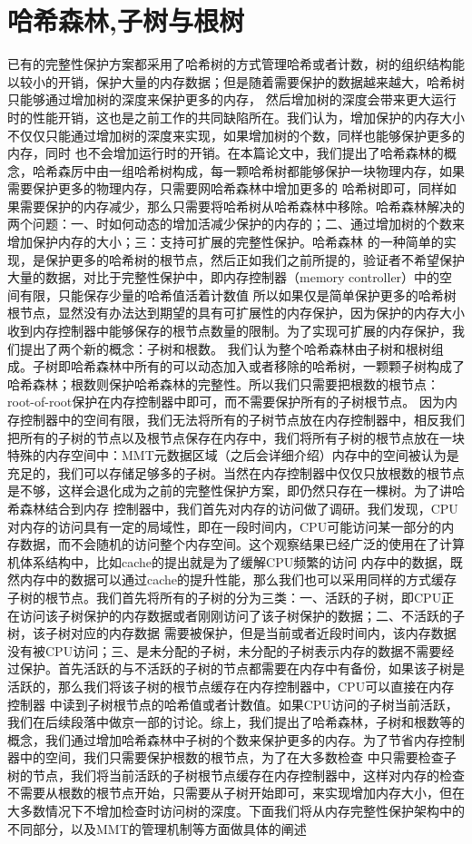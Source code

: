 \section{哈希森林,子树与根树}
已有的完整性保护方案都采用了哈希树的方式管理哈希或者计数，树的组织结构能以较小的开销，保护大量的内存数据；但是随着需要保护的数据越来越大，哈希树只能够通过增加树的深度来保护更多的内存，
然后增加树的深度会带来更大运行时的性能开销，这也是之前工作的共同缺陷所在。我们认为，增加保护的内存大小不仅仅只能通过增加树的深度来实现，如果增加树的个数，同样也能够保护更多的内存，同时
也不会增加运行时的开销。在本篇论文中，我们提出了哈希森林的概念，哈希森厉中由一组哈希树构成，每一颗哈希树都能够保护一块物理内存，如果需要保护更多的物理内存，只需要网哈希森林中增加更多的
哈希树即可，同样如果需要保护的内存减少，那么只需要将哈希树从哈希森林中移除。哈希森林解决的两个问题：一、时如何动态的增加活减少保护的内存的；二、通过增加树的个数来增加保护内存的大小；三：支持可扩展的完整性保护。哈希森林
的一种简单的实现，是保护更多的哈希树的根节点，然后正如我们之前所提的，验证者不希望保护大量的数据，对比于完整性保护中，即内存控制器（memory controller）中的空间有限，只能保存少量的哈希值活着计数值
所以如果仅是简单保护更多的哈希树根节点，显然没有办法达到期望的具有可扩展性的内存保护，因为保护的内存大小收到内存控制器中能够保存的根节点数量的限制。为了实现可扩展的内存保护，我们提出了两个新的概念：子树和根数。
我们认为整个哈希森林由子树和根树组成。子树即哈希森林中所有的可以动态加入或者移除的哈希树，一颗颗子树构成了哈希森林；根数则保护哈希森林的完整性。所以我们只需要把根数的根节点：root-of-root保护在内存控制器中即可，而不需要保护所有的子树根节点。
因为内存控制器中的空间有限，我们无法将所有的子树节点放在内存控制器中，相反我们把所有的子树的节点以及根节点保存在内存中，我们将所有子树的根节点放在一块特殊的内存空间中：MMT元数据区域（之后会详细介绍）内存中的空间被认为是充足的，我们可以存储足够多的子树。当然在内存控制器中仅仅只放根数的根节点是不够，这样会退化成为之前的完整性保护方案，即仍然只存在一棵树。为了讲哈希森林结合到内存
控制器中，我们首先对内存的访问做了调研。我们发现，CPU对内存的访问具有一定的局域性，即在一段时间内，CPU可能访问某一部分的内存数据，而不会随机的访问整个内存空间。这个观察结果已经广泛的使用在了计算机体系结构中，比如cache的提出就是为了缓解CPU频繁的访问
内存中的数据，既然内存中的数据可以通过cache的提升性能，那么我们也可以采用同样的方式缓存子树的根节点。我们首先将所有的子树的分为三类：一、活跃的子树，即CPU正在访问该子树保护的内存数据或者刚刚访问了该子树保护的数据；二、不活跃的子树，该子树对应的内存数据
需要被保护，但是当前或者近段时间内，该内存数据没有被CPU访问；三、是未分配的子树，未分配的子树表示内存的数据不需要经过保护。首先活跃的与不活跃的子树的节点都需要在内存中有备份，如果该子树是活跃的，那么我们将该子树的根节点缓存在内存控制器中，CPU可以直接在内存控制器
中读到子树根节点的哈希值或者计数值。如果CPU访问的子树当前活跃，我们在后续段落中做京一部的讨论。综上，我们提出了哈希森林，子树和根数等的概念，我们通过增加哈希森林中子树的个数来保护更多的内存。为了节省内存控制器中的空间，我们只需要保护根数的根节点，为了在大多数检查
中只需要检查子树的节点，我们将当前活跃的子树根节点缓存在内存控制器中，这样对内存的检查不需要从根数的根节点开始，只需要从子树开始即可，来实现增加内存大小，但在大多数情况下不增加检查时访问树的深度。下面我们将从内存完整性保护架构中的不同部分，以及MMT的管理机制等方面做具体的阐述

